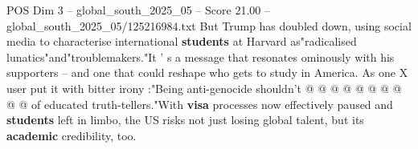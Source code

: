 \begin{textsample}{POS Dim 3 – global\_south\_2025\_05 – Score 21.00 – global\_south\_2025\_05/125216984.txt}
But Trump has doubled down, using social media to characterise international \textbf{students} at Harvard as"radicalised lunatics"and"troublemakers."It ' s a message that resonates ominously with his supporters -- and one that could reshape who gets to study in America.
As one X user put it with bitter irony :"Being anti-genocide shouldn't @ @ @ @ @ @ @ @ @ @ of educated truth-tellers."With \textbf{visa} processes now effectively paused and \textbf{students} left in limbo, the US risks not just losing global talent, but its \textbf{academic} credibility, too.

\end{textsample}
